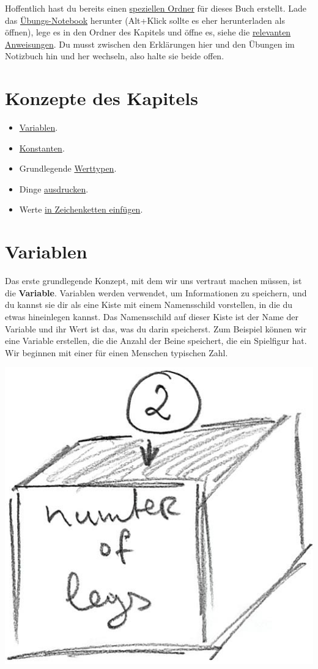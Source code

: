 \documentclass[
]{book}
\providecommand{\tightlist}{%
  \setlength{\itemsep}{0pt}\setlength{\parskip}{0pt}}
\begin{document}
Hoffentlich hast du bereits einen \protect\hyperlink{files-folder}{speziellen Ordner} für dieses Buch erstellt. Lade das \href{notebooks/Basics.ipynb}{Übungs-Notebook} herunter (Alt+Klick sollte es eher herunterladen als öffnen), lege es in den Ordner des Kapitels und öffne es, siehe die \protect\hyperlink{jupyter-notebooks}{relevanten Anweisungen}. Du musst zwischen den Erklärungen hier und den Übungen im Notizbuch hin und her wechseln, also halte sie beide offen.

\hypertarget{konzepte-des-kapitels}{%
\section{Konzepte des Kapitels}\label{konzepte-des-kapitels}}

\begin{itemize}
\tightlist
\item
  \protect\hyperlink{variablen}{Variablen}.
\item
  \protect\hyperlink{constants}{Konstanten}.
\item
  Grundlegende \protect\hyperlink{value-types}{Werttypen}.
\item
  Dinge \protect\hyperlink{print}{ausdrucken}.
\item
  Werte \protect\hyperlink{string-formatting}{in Zeichenketten einfügen}.
\end{itemize}

\hypertarget{variablen}{%
\section{Variablen}\label{variablen}}

Das erste grundlegende Konzept, mit dem wir uns vertraut machen müssen, ist die \textbf{Variable}. Variablen werden verwendet, um Informationen zu speichern, und du kannst sie dir als eine Kiste mit einem Namensschild vorstellen, in die du etwas hineinlegen kannst. Das Namensschild auf dieser Kiste ist der Name der Variable und ihr Wert ist das, was du darin speicherst. Zum Beispiel können wir eine Variable erstellen, die die Anzahl der Beine speichert, die ein Spielfigur hat. Wir beginnen mit einer für einen Menschen typischen Zahl.

\begin{center}\includegraphics[width=0.5\linewidth]{images/variable-as-box} \end{center}
\end{document}
